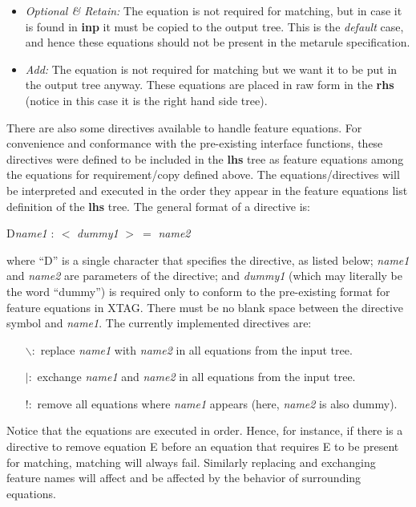 \begin{itemize}
\item   {\it Optional \& Retain:} 
        The equation is not required for matching, but 
        in case it is found in {\bf inp} it must be copied to the output tree. 
        This is the {\it default} case, and hence these equations should not be 
        present in the metarule specification. 
 
\item   {\it Add:} The equation is not required for matching but we want it to 
        be put in the output tree anyway. 
        These equations are placed in raw form in the {\bf rhs} (notice in this 
        case it is the right hand side tree). 
\end{itemize} 
 
There are also some directives available to handle feature equations. For 
convenience and conformance with the pre-existing interface functions, 
these directives were defined to be included in the {\bf lhs} tree as feature 
equations among the equations for requirement/copy defined above. The 
equations/directives will be interpreted and executed 
in the order they appear in the feature equations list definition 
of the {\bf lhs} tree. The general format of a directive is: 
 
\centerline{D{\it{}name1} $:\ <$ {\it{}dummy1} $>\ =$ {\it{}name2}} 
 
where ``D'' is a single character that specifies the directive, 
as listed below; 
{\it name1} and {\it name2} are parameters of the directive; 
and {\it dummy1} (which may literally be the word ``dummy'') is required only 
to conform to the pre-existing format for feature equations in XTAG. 
There must be no blank space between the directive symbol and {\it name1}. 
The currently implemented directives are: 
 
\begin{itemize} 
\item[$\backslash :$] replace {\it name1} with {\it name2} in all 
	equations from 
	the input tree. 
\item[{$|:$}] exchange {\it name1} and {\it name2} in all equations from 
	the input tree. 
\item[{$!:$}] remove all equations where {\it name1} appears 
	(here, {\it name2} is also dummy). 
\end{itemize} 
 
Notice that the equations are executed in order. Hence, for instance, if there 
is a directive to remove equation E before an equation that requires E to 
be present for matching, matching will always fail. Similarly replacing and 
exchanging feature names will affect and be affected by the behavior of 
surrounding equations. 
 
